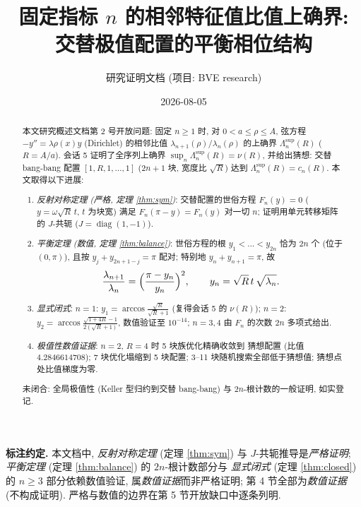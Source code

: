 \documentclass[UTF8]{ctexart}
\title{固定指标 $n$ 的相邻特征值比值上确界: 交替极值配置的平衡相位结构}
\author{研究证明文档 (项目: BVE research)}
\date{2026-08-05}
\begin{document}
\maketitle

\begin{abstract}
本文研究概述文档第 2 号开放问题: 固定 $n \geq 1$ 时, 对 $0 < a \leq
\rho \leq A$, 弦方程 $-y'' = \lambda\rho(x)y$ (Dirichlet) 的相邻比值
$\lambda_{n+1}(\rho)/\lambda_n(\rho)$ 的上确界 $\Lambda_n^{\sup}(R)$
($R = A/a$). 会话 5 证明了全序列上确界
$\sup_n \Lambda_n^{\sup}(R) = \nu(R)$, 并给出猜想: 交替 bang-bang 配置
$[1, R, 1, \dots, 1]$ ($2n+1$ 块, 宽度比 $\sqrt{R}$) 达到
$\Lambda_n^{\sup}(R) = c_n(R)$. 本文取得以下进展:
\begin{enumerate}
	\item \emph{反射对称定理 (严格, 定理 \ref{thm:sym})}: 交替配置的世俗方程
		$F_n(y) = 0$ ($y = \omega\sqrt{R}\,t$, $t$ 为块宽) 满足
		$F_n(\pi - y) = F_n(y)$ 对一切 $n$; 证明用单元转移矩阵的
		$J$-共轭 ($J = \operatorname{diag}(1,-1)$).
	\item \emph{平衡定理 (数值, 定理 \ref{thm:balance})}: 世俗方程的根
		$y_1 < \dots < y_{2n}$ 恰为 $2n$ 个 (位于 $(0,\pi)$), 且按
		$y_j + y_{2n+1-j} = \pi$ 配对; 特别地
		$y_n + y_{n+1} = \pi$, 故
		\begin{equation}
			\frac{\lambda_{n+1}}{\lambda_n} = \Bigl(\frac{\pi - y_n}{y_n}\Bigr)^2,
			\qquad y_n = \sqrt{R}\,t\,\sqrt{\lambda_n}.
		\end{equation}
	\item \emph{显式闭式}: $n=1$: $y_1 = \arccos\frac{\sqrt R}{\sqrt R + 1}$
		(复得会话 5 的 $\nu(R)$); $n=2$:
		$y_2 = \arccos\frac{\sqrt{1+4R}-1}{2(\sqrt R+1)}$, 数值验证至
		$10^{-14}$; $n = 3, 4$ 由 $F_n$ 的次数 $2n$ 多项式给出.
	\item \emph{极值性数值证据}: $n=2$, $R=4$ 时 5 块族优化精确收敛到
		猜想配置 (比值 $4.2846614708$); 7 块优化塌缩到 5 块配置;
		3--11 块随机搜索全部低于猜想值; 猜想点处比值梯度为零.
\end{enumerate}
未闭合: 全局极值性 (Keller 型归约到交替 bang-bang) 与
$2n$-根计数的一般证明, 如实登记.
\end{abstract}

\medskip
\noindent\textbf{标注约定.} 本文档中, \emph{反射对称定理}
(定理 \ref{thm:sym}) 与 $J$-共轭推导是\emph{严格证明};
\emph{平衡定理} (定理 \ref{thm:balance}) 的 $2n$-根计数部分与
\emph{显式闭式} (定理 \ref{thm:closed}) 的 $n \ge 3$ 部分依赖数值验证,
属\emph{数值证据}而非严格证明; 第 4 节全部为\emph{数值证据}
(不构成证明). 严格与数值的边界在第 5 节开放缺口中逐条列明.
\end{document}
